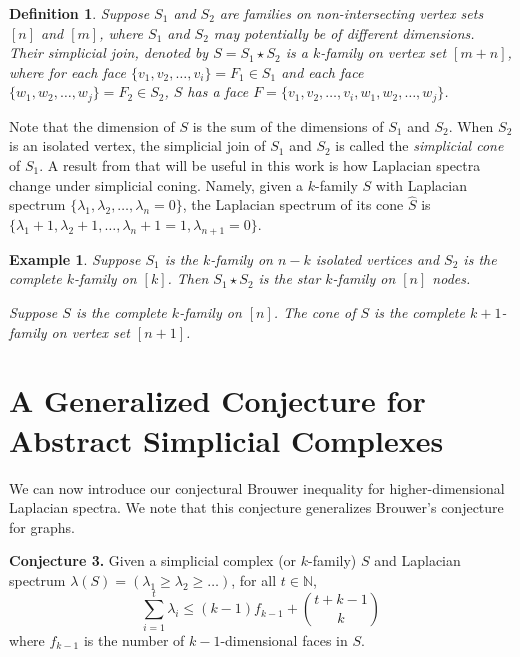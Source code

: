 \documentclass[11pt]{article}
\newtheorem{defi}[lm]{Definition}
\newtheorem{eg}[lm]{Example}
\begin{document}
\begin{defi}
Suppose $S_1$ and $S_2$ are families on non-intersecting vertex sets $[n]$ and $[m]$, where $S_1$ and $S_2$ may potentially be of different dimensions. Their \emph{simplicial join}, denoted by $S = S_1 \star S_2$ is a $k$-family on vertex set $[m + n]$, where for each face $\{v_1, v_2, \ldots, v_i\} = F_1 \in S_1$ and each face $\{w_1, w_2, \ldots, w_j\} = F_2 \in S_2$, $S$ has a face $F = \{v_1, v_2, \ldots, v_i, w_1, w_2, \ldots, w_j\}$.
\end{defi}

Note that the dimension of $S$ is the sum of the dimensions of $S_1$ and $S_2$. When $S_2$ is an isolated vertex, the simplicial join of $S_1$ and $S_2$ is called the \emph{simplicial cone} of $S_1$. A result from \cite{DR} that will be useful in this work is how Laplacian spectra change under simplicial coning. Namely, given a $k$-family $S$ with Laplacian spectrum $\{\lambda_1, \lambda_2, \ldots, \lambda_n=0 \}$, the Laplacian spectrum of its cone $\hat{S}$ is $\{\lambda_1 +1, \lambda_2 +1, \ldots , \lambda_n + 1 = 1, \lambda_{n+1} = 0\}$.

\begin{eg}
Suppose $S_1$ is the $k$-family on $n-k$ isolated vertices and $S_2$ is the complete $k$-family on $[k]$. Then $S_1 \star S_2$ is the star $k$-family on $[n]$ nodes.

Suppose $S$ is the complete $k$-family on $[n]$. The cone of $S$ is the complete $k+1$-family on vertex set $[n + 1]$.
\end{eg}





\section{A Generalized Conjecture for Abstract Simplicial Complexes}\label{sec:gbc}

We can now introduce our conjectural Brouwer inequality for higher-dimensional Laplacian spectra. We note that this conjecture generalizes Brouwer's conjecture for graphs.

\vspace{2mm}

\noindent \textbf{Conjecture 3.} Given a simplicial complex (or $k$-family) $S$ and Laplacian spectrum $\lambda(S) = \left( \lambda_1 \geq \lambda_2 \geq \ldots \right)$, for all $t \in \mathbb{N}$,
\[ \sum_{i=1}^{t} \lambda_i \leq (k - 1) f_{k-1}+ \binom{t+k -1}{k}\]
where $f_{k-1}$ is the number of $k-1$-dimensional faces in $S$.
\end{document}
